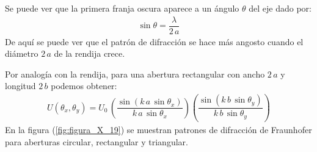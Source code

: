 \documentclass[14pt]{extarticle}
\begin{document}
Se puede ver que la primera franja oscura aparece a un ángulo $\theta$ del eje dado por:
\begin{align}
\sin \theta = \dfrac{\lambda}{2 \, a}
\label{eq:ecuacion_X_48}
\end{align}
De aquí se puede ver que el patrón de difracción se hace más angosto cuando el diámetro $2 \, a$ de la rendija crece.
\par
Por analogía con la rendija, para una abertura rectangular con ancho $2 \, a$ y longitud $2 \, b$ podemos obtener:
\begin{align}
U \left( \theta_{x}, \theta_{y} \right) = U_{0} \, \left( \dfrac{\sin (k \, a \, \sin \theta_{x})}{k \, a \, \sin \theta_{x}} \right) \left( \dfrac{\sin (k \, b \, \sin \theta_{y})}{k \, b \, \sin \theta_{y}} \right)
\label{eq:ecuacion_X_49}
\end{align}
En la figura (\ref{fig:figura_X_19}) se muestran patrones de difracción de Fraunhofer para aberturas circular, rectangular y triangular.
\end{document}
